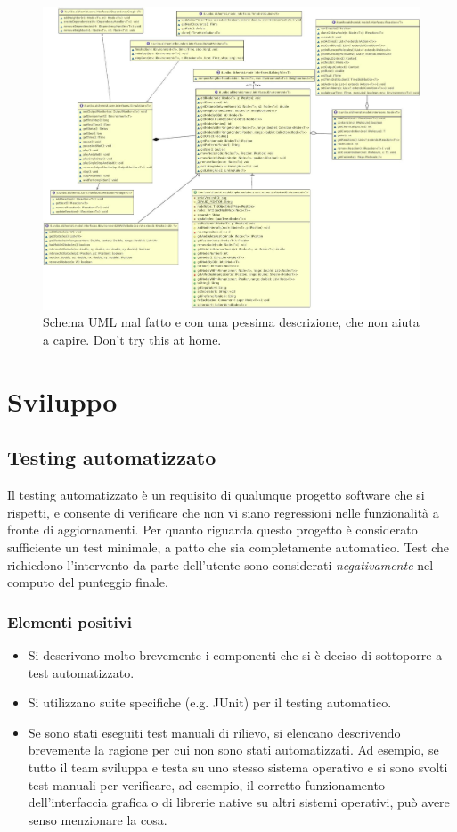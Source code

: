 \documentclass[a4paper,12pt]{report}
\begin{document}
\begin{figure}[h]
\centering{}
\includegraphics[width=\textwidth]{img/badarch}
\caption{Schema UML mal fatto e con una pessima descrizione, che non aiuta a capire. Don't try this at home.}
\label{img:badarch}
\end{figure}


\chapter{Sviluppo}
\section{Testing automatizzato}

Il testing automatizzato è un requisito di qualunque progetto software che si rispetti, e consente di verificare che non vi siano regressioni nelle funzionalità a fronte di aggiornamenti.
%
Per quanto riguarda questo progetto è considerato sufficiente un test minimale, a patto che sia completamente automatico.
%
Test che richiedono l'intervento da parte dell'utente sono considerati \textit{negativamente} nel computo del punteggio finale.

\subsection*{Elementi positivi}

\begin{itemize}
 \item Si descrivono molto brevemente i componenti che si è deciso di sottoporre a test automatizzato.
 \item Si utilizzano suite specifiche (e.g. JUnit) per il testing automatico.
 \item Se sono stati eseguiti test manuali di rilievo, si elencano descrivendo brevemente la ragione per cui non sono stati automatizzati. Ad esempio, se tutto il team sviluppa e testa su uno stesso sistema operativo e si sono svolti test manuali per verificare, ad esempio, il corretto funzionamento dell'interfaccia grafica o di librerie native su altri sistemi operativi, può avere senso menzionare la cosa.
\end{itemize}
\end{document}
